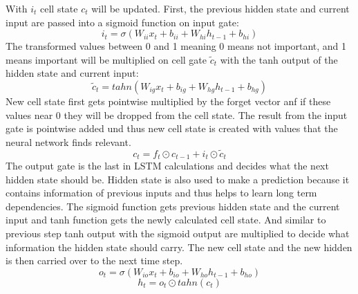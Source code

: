 With $i_t$ cell state $c_t$ will be updated. First, the previous hidden state and current input are passed into a sigmoid function on input gate:
\begin{equation}
i_t = \sigma (W_{ii}x_t + b_{ii} + W_{hi}h_{t-1} + b_{hi})
\end{equation}
The transformed values between 0 and 1 meaning 0 means not important, and 1 means important will be multiplied on cell gate $\tilde{c}_t$ with the tanh output of the hidden state and current input:
\begin{equation}
\tilde{c}_t = tahn (W_{ig}x_t + b_{ig} + W_{hg}h_{t-1} + b_{hg})
\end{equation}
New cell state first gets pointwise multiplied by the forget vector anf if these values near 0 they will be dropped from the cell state. The result from the input gate is pointwise added und thus new cell state is created with values that the neural network finds relevant.
\begin{equation}
c_t = f_t \odot c_{t-1} + i_t \odot \tilde{c}_t
\end{equation}
The output gate is the last in LSTM calculations and decides what the next hidden state should be. Hidden state is also used to make a prediction because it contains information of previous inputs and thus helps to learn long term dependencies. The sigmoid function gets previous hidden state and the current input and tanh function gets the newly calculated cell state. And similar to previous step tanh output with the sigmoid output are multiplied to decide what information the hidden state should carry. The new cell state and the new hidden is then carried over to the next time step.
\begin{equation}
o_t = \sigma (W_{io}x_t + b_{io} + W_{ho}h_{t-1} + b_{ho})
\end{equation}
\begin{equation}
h_t = o_t \odot tahn(c_t)
\end{equation}


